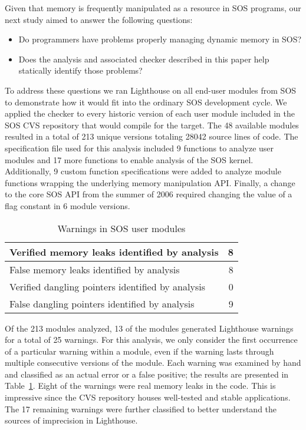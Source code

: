 Given that memory is frequently manipulated as a resource in SOS
programs, our next study aimed to answer the following questions:
%
\begin{itemize}
%
\item Do programmers have problems properly managing dynamic memory in
SOS?
%
\item Does the analysis and associated checker described in this paper
help statically identify those problems?
%
\end{itemize}



To address these questions we ran Lighthouse on all end-user modules
from SOS to demonstrate how it would fit into the ordinary SOS
development cycle.  
%
We applied the checker to every historic version of each user module
included in the SOS CVS repository that would compile for the
 target.  
%
The 48 available modules resulted in a total of 213 unique versions
totaling 28042 source lines of code.
%
The specification file used for this analysis included 9 functions to
analyze user modules and 17 more functions to enable analysis of the SOS
kernel.
%
Additionally, 9 custom function specifications were added to analyze
module functions wrapping the underlying memory manipulation API.
%
Finally, a change to the core SOS API from the summer of 2006 required
changing the value of a flag constant in 6 module versions.



\begin{table}
\caption{Warnings in SOS user modules}
%
\label{tab:module}
\centering 
\begin{tabular}{| l | r |}
    \hline 
    Verified memory leaks identified by analysis & 8 \\
    \hline
    False memory leaks identified by analysis & 8 \\
    \hline 
    Verified dangling pointers identified by analysis & 0 \\
    \hline 
    False dangling pointers identified by analysis & 9 \\
    \hline 
\end{tabular} 
%
\end{table}



Of the 213 modules analyzed, 13 of the modules generated Lighthouse
warnings for a total of 25 warnings.
%
For this analysis, we only consider the first occurrence of a particular
warning within a module, even if the warning lasts through multiple
consecutive versions of the module.  
%
Each warning was examined by hand and classified as an actual error or a
false positive; the results are presented in Table~\ref{tab:module}.  
%
Eight of the warnings were real memory leaks in the code.  This is
impressive since the CVS repository houses well-tested and stable
applications.
%
The 17 remaining warnings were further classified to better understand
the sources of imprecision in Lighthouse.  



